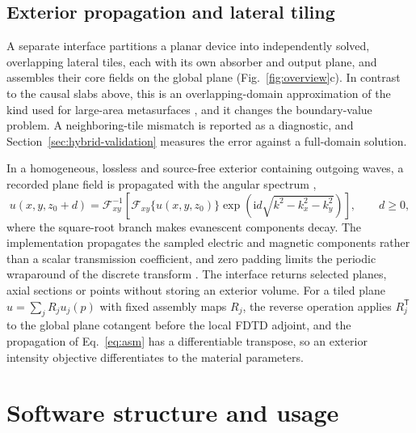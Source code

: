 \documentclass[preprint,11pt]{elsarticle}
\begin{document}
\subsection{Exterior propagation and lateral tiling}
\label{sec:hybrid}

A separate interface partitions a planar device into independently solved, overlapping lateral tiles, each with its own absorber and output plane, and assembles their core fields on the global plane (Fig.~\ref{fig:overview}c). In contrast to the causal slabs above, this is an overlapping-domain approximation of the kind used for large-area metasurfaces \citep{pestourie2018,lin2019}, and it changes the boundary-value problem. A neighboring-tile mismatch is reported as a diagnostic, and Section~\ref{sec:hybrid-validation} measures the error against a full-domain solution.

In a homogeneous, lossless and source-free exterior containing outgoing waves, a recorded plane field is propagated with the angular spectrum \citep{goodman2005},
\begin{equation}
u(x,y,z_0+d)=\mathcal{F}^{-1}_{xy}
 \left[\mathcal{F}_{xy}\{u(x,y,z_0)\}
 \exp\!\left(\mathrm{i}d\sqrt{k^2-k_x^2-k_y^2}\right)\right],
\qquad d\geq0,
\label{eq:asm}
\end{equation}
where the square-root branch makes evanescent components decay. The implementation propagates the sampled electric and magnetic components rather than a scalar transmission coefficient, and zero padding limits the periodic wraparound of the discrete transform \citep{matsushima2009}. The interface returns selected planes, axial sections or points without storing an exterior volume. For a tiled plane $u=\sum_j R_j u_j(p)$ with fixed assembly maps $R_j$, the reverse operation applies $R_j^{\mathsf T}$ to the global plane cotangent before the local FDTD adjoint, and the propagation of Eq.~\eqref{eq:asm} has a differentiable transpose, so an exterior intensity objective differentiates to the material parameters.

\section{Software structure and usage}
\label{sec:software}
\end{document}

